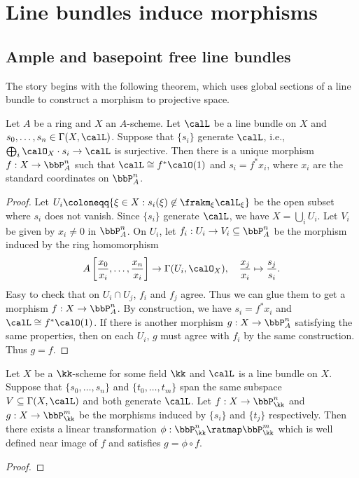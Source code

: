 \section{Line bundles induce morphisms}


\subsection{Ample and basepoint free line bundles}

    The story begins with the following theorem, which uses global sections of a line bundle to construct a morphism to projective space.

    \begin{theorem}\label{thm:morphism_to_projective_space}
        Let \(A\) be a ring and \(X\) an \(A\)-scheme.
        Let \(\calL\) be a line bundle on \(X\) and \(s_0,\ldots,s_n\in\Gamma(X,\calL)\).
        Suppose that \(\{s_i\}\) generate \(\calL\), i.e., \(\bigoplus_i \calO_X\cdot s_i \to \calL\) is surjective.
        Then there is a unique morphism \(f:X\to \bbP^n_A\) such that \(\calL\cong f^*\calO(1)\) and \(s_i=f^*x_i\), where \(x_i\) are the standard coordinates on \(\bbP^n_A\).   
    \end{theorem}
    \begin{proof}
        Let \(U_i\coloneqq \{\xi \in X: s_i(\xi) \not\in \frakm_\xi \calL_\xi\}\) be the open subset where \(s_i\) does not vanish.
        Since \(\{s_i\}\) generate \(\calL\), we have \(X=\bigcup_i U_i\).
        Let \(V_i\) be given by \(x_i \neq 0\) in \(\bbP^n_A\).
        On \(U_i\), let \(f_i:U_i\to V_i \subseteq \bbP^n_A\) be the morphism induced by the ring homomorphism
        \[ A\left[\frac{x_0}{x_i},\ldots,\frac{x_n}{x_i}\right] \to \Gamma(U_i,\calO_X), \quad \frac{x_j}{x_i} \mapsto \frac{s_j}{s_i}. \]
        Easy to check that on \(U_i\cap U_j\), \(f_i\) and \(f_j\) agree.
        Thus we can glue them to get a morphism \(f:X\to \bbP^n_A\).
        By construction, we have \(s_i=f^*x_i\) and \(\calL\cong f^*\calO(1)\).
        If there is another morphism \(g:X\to \bbP^n_A\) satisfying the same properties, then on each \(U_i\), \(g\) must agree with \(f_i\) by the same construction.
        Thus \(g=f\).
    \end{proof}

    \begin{proposition}\label{prop:different_choices_of_sections_give_different_morphisms_which_differ_by_a_linear_transformation}
        Let \(X\) be a \(\kk\)-scheme for some field \(\kk\) and \(\calL\) is a line bundle on \(X\).
        Suppose that \(\{s_0,\ldots,s_n\}\) and \(\{t_0,\ldots,t_m\}\) span the same subspace \(V\subseteq \Gamma(X,\calL)\) and both generate \(\calL\).
        Let \(f:X\to \bbP^n_\kk\) and \(g:X\to \bbP^m_\kk\) be the morphisms induced by \(\{s_i\}\) and \(\{t_j\}\) respectively.
        Then there exists a linear transformation \(\phi:\bbP^n_\kk \ratmap \bbP^m_\kk\) which is well defined near image of \(f\) and satisfies \(g=\phi \circ f\).
    \end{proposition}
    \begin{proof}
    \end{proof}

